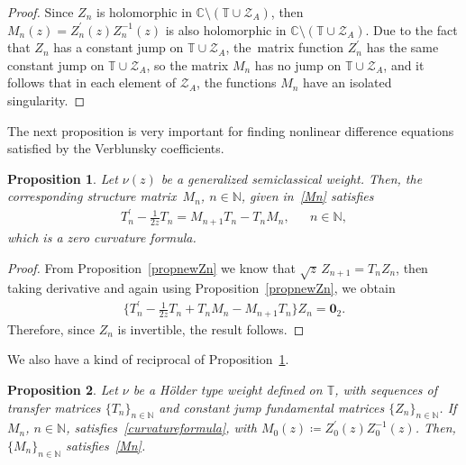 \documentclass[12pt]{amsart}
\newtheorem{proposition}{Proposition}[section]
\begin{document}
\begin{proof}
 Since \( Z_n \) is holomorphic in \( \mathbb{C}\setminus( \mathbb{T}\cup\mathcal{Z}_A ) \), then
\( M_n(z)=Z_n^\prime (z)Z_n^{-1}(z) \) is also holomorphic in \( \mathbb{C}\setminus( \mathbb{T}\cup\mathcal{Z}_A ) \). 
Due to the fact that \( Z_n \) has a constant jump on \( \mathbb{T}\cup \mathcal{Z}_A \), the~matrix function \( Z_n^\prime \) has the same constant jump on \( \mathbb{T}\cup \mathcal{Z}_A \), so the matrix \( M_n \) has no jump on \( \mathbb{T}\cup \mathcal{Z}_A \), and it follows that in each element of \( \mathcal Z_A \), the functions \( M_n \) have an isolated singularity. 
\end{proof}


The next proposition is very important for finding nonlinear difference equations satisfied by the Verblunsky coefficients.

\begin{proposition}\label{propnula} 
Let \( \nu(z) \) be a
generalized
semiclassical weight.
Then, the corresponding structure matrix~\( M_n \), \( n\in\mathbb{N} \), given in~\eqref{Mn}
 satisfies
\begin{align}\label{curvatureformula}
T_n^\prime - \frac 1 {2z} T_n
 =
{M}_{n+1}T_n -T_n {M}_n ,
&& n \in \mathbb N ,
\end{align}
which is a zero curvature formula.
\end{proposition}


\begin{proof}
From Proposition~\ref{propnewZn} we know that \( \sqrt{z} \, Z_{n+1}=T_nZ_n \), then taking derivative
 and again using 
Proposition~\ref{propnewZn}, we obtain
\begin{align*}
\Big\{ T_n^\prime -\frac{1}{2z}T_n +T_n{M}_n-{M}_{n+1}T_n \Big\} Z_n
=\mathbf{0}_{2}.
\end{align*}
Therefore, since \( Z_n \) is invertible, 
the result follows.
\end{proof}

We also have a kind of reciprocal of Proposition~\ref{propnula}.

\begin{proposition}\label{propeqfund1} 
Let \( \nu \) be a H\"older type weight defined on \( \mathbb T \), with sequences of transfer matrices \( \{ T_n \}_{n \in \mathbb N} \) and constant jump fundamental matrices \( \{ Z_n \}_{n \in \mathbb N} \).
If \( M_n \), \( n\in\mathbb{N} \), satisfies~\eqref{curvatureformula}, with
 \( M_0(z) \coloneqq Z_0^\prime(z) Z_0^{-1}(z)\). Then,
\( \{ M_n \}_{n \in \mathbb N} \) satisfies~\eqref{Mn}. 
\end{proposition}
\end{document}
